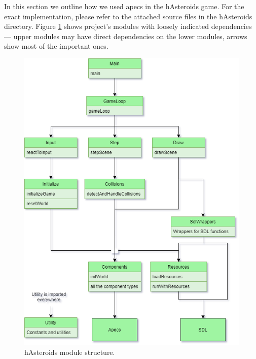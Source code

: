 \documentclass[
  digital, %
  color,   %
  table,   %
  oneside, %
  lof,     %
  lot,     %
]{fithesis3}
\begin{document}
In this section we outline how we used apecs in the hAsteroids game.
For the exact implementation, please refer to the attached source files in the hAsteroids directory.
Figure \ref{fig:hasteroidsmodules} shows project's modules with loosely indicated
dependencies --- upper modules may have direct dependencies on the lower modules,
arrows show most of the important ones. %
\begin{figure}
    \centering
    \includegraphics[width=\textwidth]{images/modules.png}
    \caption{hAsteroids module structure.}
    \label{fig:hasteroidsmodules}
\end{figure}


\end{document}
